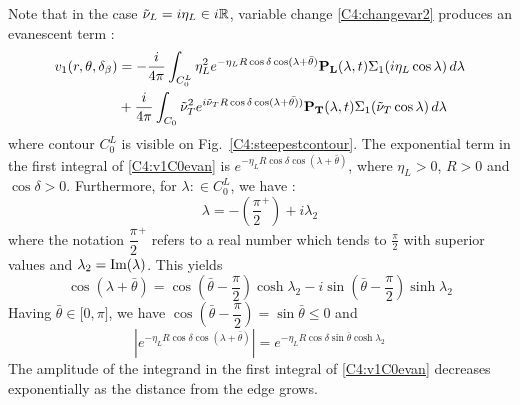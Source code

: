 Note that in the case $\tilde{\nu}_L =i\eta_L \in i\mathbb{R}$, variable change \eqref{C4:changevar2} produces an evanescent term :
\begin{equation}
\begin{split}
v_1(r,\theta,\delta_{\beta})&=-\frac{i}{4\pi} \int_{C_0^L}\eta_L^2 e^{-\eta_L R\cos\delta\cos(\lambda+\bar{\theta})}\mathbf{ P_L}(\lambda,t)\Sigma_1(i\eta_L\cos\lambda) \, d\lambda\\
&+\frac{i}{4\pi} \int_{C_0}\tilde{\nu}_T^2 e^{i\tilde{\nu}_T R\cos\delta\cos(\lambda+\bar{\theta)})}\mathbf{ P_T}(\lambda,t)\Sigma_1(\tilde{\nu}_T\cos\lambda) \, d\lambda
\end{split}
\label{C4:v1C0evan}
\end{equation}
where contour $C_0^L$ is visible on Fig.~\ref{C4:steepestcontour}. The exponential term in the first integral of \eqref{C4:v1C0evan} is $e^{-\eta_L R\cos\delta\cos(\lambda+\bar{\theta})}$, where $\eta_L>0$, $R>0$ and $\cos\delta>0$. Furthermore, for $\lambda :\in C_0^L$, we have :
\begin{equation}
\lambda=-\left(\dfrac{\pi}{2}^+\right)+i\lambda_2
\end{equation}
where the notation $\dfrac{\pi}{2}^+$ refers to a real number which tends to $\frac{\pi}{2}$ with superior values and $\lambda_2=\rm Im(\lambda)$. This yields
\begin{equation}
\cos(\lambda+\bar{\theta})=\cos(\bar{\theta}-\dfrac{\pi}{2})\cosh\lambda_2-i\sin(\bar{\theta}-\dfrac{\pi}{2})\sinh\lambda_2
\end{equation}
Having $\bar{\theta} \in \lbrack 0,\pi \rbrack$, we have $\cos(\bar{\theta}-\dfrac{\pi}{2})=\sin\bar{\theta}\leq 0$ and 
\begin{equation}
|e^{-\eta_L R\cos\delta\cos(\lambda+\bar{\theta})}|=e^{-\eta_L R\cos\delta\sin\bar{\theta}\cosh\lambda_2}
\end{equation}
The amplitude of the integrand in the first integral of \eqref{C4:v1C0evan} decreases exponentially as the distance from the edge grows. %

